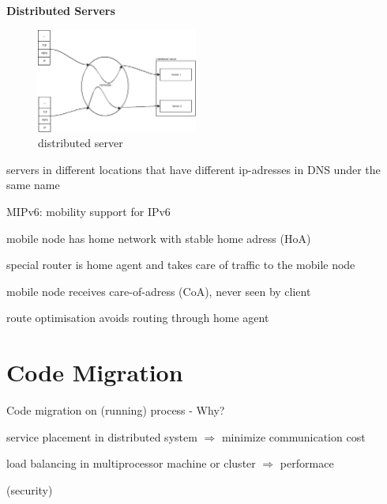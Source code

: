 \textbf{Distributed Servers}\\
\begin{figure}[h]
	\centering
	\includegraphics[width=200px]{gfx/distrb_server.png}
	\caption{distributed server}
	\label{img:distrb_serv}
\end{figure}
\begin{compactitem}
	\item servers in different locations that have different ip-adresses in DNS under the same name
	\item MIPv6: mobility support for IPv6
	\item mobile node has home network with stable home adress (HoA)
	\item special router is home agent and takes care of traffic to the mobile node
	\item mobile node receives care-of-adress (CoA), never seen by client
	\item route optimisation avoids routing through home agent
\end{compactitem}

\section{Code Migration}
\begin{compactitem}
	\item Code migration on (running) process - Why?
	\item service placement in distributed system $\Rightarrow$ minimize communication cost
	\item load balancing in multiprocessor machine or cluster $\Rightarrow$ performace
	\item (security)

\end{compactitem}

